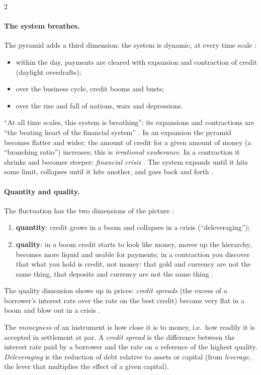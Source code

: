 \begin{paracol}{2}
\paragraph{The system breathes.} The pyramid adds a third dimension: the system is dynamic, at every time scale
:
\begin{itemize}
  \item within the day, payments are cleared with expansion and contraction of credit (daylight overdrafts);
  \item over the business cycle, credit booms and busts;
  \item over the rise and fall of nations, wars and depressions.
\end{itemize}
``At all time scales, this system is breathing'': its expansions and contractions are ``the beating heart of the
financial system'' . In an expansion the pyramid becomes flatter and wider: the amount of credit for a
given amount of money (a ``branching ratio'') increases; this is \emph{irrational exuberance}. In a contraction it
shrinks and becomes steeper: \emph{financial crisis} . The system expands until it hits
some limit, collapses until it hits another, and goes back and forth .

\paragraph{Quantity and quality.} The fluctuation has the two dimensions of the picture :
\begin{enumerate}
  \item \textbf{quantity}: credit grows in a boom and collapses in a crisis (``deleveraging'');
  \item \textbf{quality}: in a boom credit starts to look like money, moves up the hierarchy, becomes more liquid and
        usable for payments; in a contraction you discover that what you hold is credit, not money: that gold and
        currency are not the same thing, that deposits and currency are not the same thing .
\end{enumerate}
The quality dimension shows up in prices: \emph{credit spreads} (the excess of a borrower's interest rate over the
rate on the best credit) become very flat in a boom and blow out in a crisis .

\begin{definition}
The \emph{moneyness} of an instrument is how close it is to money, i.e.\ how readily it is accepted in settlement at
par. A \emph{credit spread} is the difference between the interest rate paid by a borrower and the rate on a
reference of the highest quality. \emph{Deleveraging} is the reduction of debt relative to assets or capital (from
\emph{leverage}, the lever that multiplies the effect of a given capital).
\end{definition}


\end{paracol}
